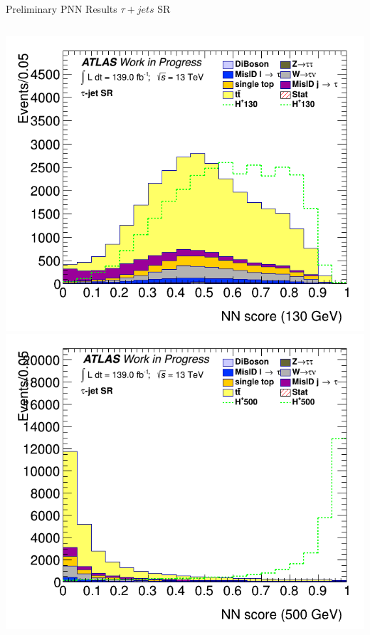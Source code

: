 \documentclass[aspectratio=169,xcolor=table]{beamer}
\begin{document}
\begin{frame}[t]{Preliminary PNN Results $\tau+jets$ SR}
\begin{columns}[t]
        \includegraphics[height=.43\textheight,keepaspectratio=true]{Scores/taujet/rnnTest_1p_3p_noweight/clf_score_GB200_mass_130to130_SR_TAUJET.png}
        \includegraphics[height=.43\textheight,keepaspectratio=true]{Scores/taujet/rnnTest_1p_3p_noweight/clf_score_GB200_mass_500to500_SR_TAUJET.png}


\end{columns}
\end{frame}
\end{document}
